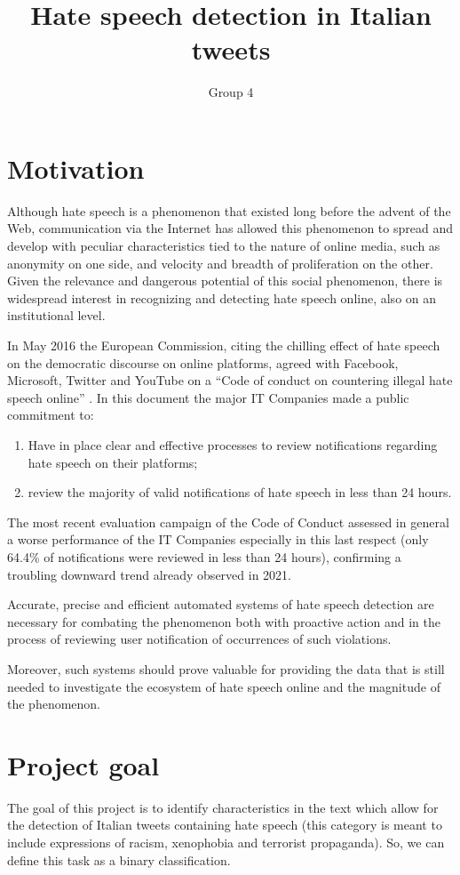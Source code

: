 \documentclass[a4paper, 10pt, twocolumn, DIV=calc]{scrartcl}
\begin{document}
\author{Group 4}
\title{Hate speech detection in Italian tweets}

\maketitle
\section{Motivation}
Although hate speech is a phenomenon that existed long before the advent of the Web, communication via the Internet has allowed this phenomenon to spread and develop with peculiar characteristics tied to the nature of online media, such as anonymity on one side, and velocity and breadth of proliferation on the other. Given the relevance and dangerous potential of this social phenomenon, there is widespread interest in recognizing and detecting hate speech online, also on an institutional level.

In May 2016 the European Commission, citing the chilling effect of hate speech on the democratic discourse on online platforms,  agreed with Facebook, Microsoft, Twitter and YouTube on a ``Code of conduct on countering illegal hate speech online'' \cite{european_commission_code}.
In this document the major IT Companies made a public commitment to:
\begin{enumerate}
  \item Have in place clear and effective processes to review notifications regarding hate speech on their platforms;
  \item review the majority of valid notifications of hate speech in less than 24 hours.   
\end{enumerate}

The most recent evaluation campaign of the Code of Conduct \cite{reynders_factsheet} assessed in general a worse performance of the IT Companies especially in this last respect (only 64.4\% of notifications were reviewed in less than 24 hours), confirming a troubling downward trend already observed in 2021. 

Accurate, precise and efficient automated systems of hate speech detection are necessary for combating the phenomenon both with proactive action and in the process of reviewing user notification of occurrences of such violations.

Moreover, such systems should prove valuable for providing the data that is still needed to investigate the ecosystem of hate speech online and the magnitude of the phenomenon.
\section{Project goal}
The goal of this project is to identify characteristics in the text which allow for the detection of Italian tweets containing hate speech (this category is meant to include expressions of racism, xenophobia and terrorist propaganda).
So, we can define this task as a binary classification. 
\end{document}
